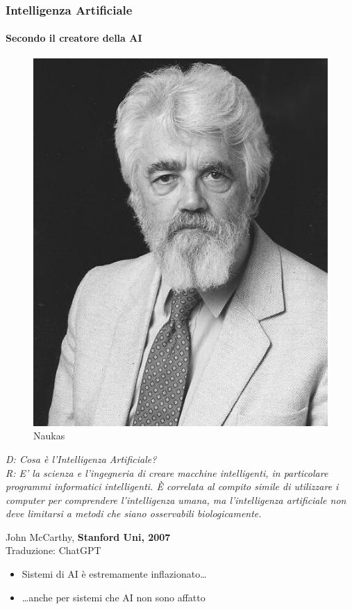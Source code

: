 \begin{frame}[t] \frametitle{Intelligenza Artificiale}
{\scriptsize
	\onslide<1->
		\framesubtitle{Secondo il creatore della AI}
		\vspace*{.3cm}
		\begin{minipage}[t]{\textwidth}
			\begin{minipage}[t]{0.45\textwidth}
				\centering
				\begin{figure}[ht]
					\includegraphics[width=.73\textwidth]{img/John-McCarthy.jpg}
					{\tiny\\\textcopyright Naukas}
				\end{figure}
			\end{minipage}
		    \begin{minipage}[t]{0.5\textwidth}
				\renewcommand{\epigraphsize}{\small}
				\setlength{\afterepigraphskip}{0pt}
				\setlength{\beforeepigraphskip}{5pt}
				\setlength{\epigraphwidth}{\textwidth}
				\epigraph{
					\textit{\alert{D:} Cosa è l'Intelligenza Artificiale?\\
					\alert{R:} E' la scienza e l'ingegneria di creare macchine intelligenti, in particolare programmi informatici intelligenti. È correlata al compito simile di utilizzare i computer per comprendere l'intelligenza umana, ma l'intelligenza artificiale non deve limitarsi a metodi che siano osservabili biologicamente.}}{John McCarthy, \textbf{Stanford Uni, 2007}\\Traduzione: \textcopyright ChatGPT}
			\end{minipage}
		\end{minipage}
}
	\begin{itemize}[leftmargin=10pt,align=right]
		\item[\alert{\faHandORight}] Sistemi di AI è estremamente inflazionato\ldots 
		\onslide<3->\item[\alert{\faHandORight}] \ldots anche per sistemi che AI non sono affatto
	\end{itemize}
\end{frame}

